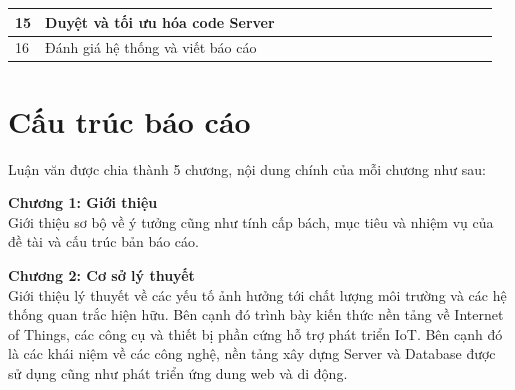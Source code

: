 \begin{landscape}
\begin{table}[]
\begin{tabular}{|l|l|l|l|l|l|l|l|l|l|l|l|l|l|l|l|l|}
15                                          & Duyệt và tối ưu hóa code Server                                                                                  &                          &                                                 &                          &                          &                          &                          &                                                 &                          &                          &                                                 &                          & \cellcolor[HTML]{000000} & \cellcolor[HTML]{000000} &                          &                          \\ \hline
16                                          & Đánh giá hệ thống và viết báo cáo                                                                                &                          &                                                 &                          &                          &                          &                          &                                                 &                          &                          &                                                 &                          &                          & \cellcolor[HTML]{000000} & \cellcolor[HTML]{000000} & \cellcolor[HTML]{000000} \\ \hline
\end{tabular}
\end{table}
\end{landscape}


\section{Cấu trúc báo cáo} %
Luận văn được chia thành 5 chương, nội dung chính của mỗi chương như sau:

\textbf{Chương 1: Giới thiệu}\\

Giới thiệu sơ bộ về ý tưởng cũng như tính cấp bách, mục tiêu và nhiệm vụ của đề tài và cấu trúc bản báo cáo.

\textbf{Chương 2: Cơ sở lý thuyết}\\

Giới thiệu lý thuyết về các yếu tố ảnh hưởng tới chất lượng môi trường và các hệ thống quan trắc hiện hữu. Bên cạnh đó trình bày kiến thức nền tảng về Internet of Things, các công cụ và thiết bị phần cứng hỗ trợ phát triển IoT. Bên cạnh đó là các khái niệm về các công nghệ, nền tảng xây dựng Server và Database được sử dụng cũng như phát triển ứng dung web và di động.

